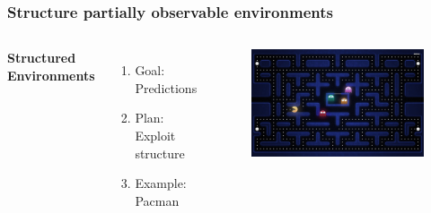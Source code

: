 \documentclass{beamer}
\begin{document}
\begin{frame}
\frametitle{Structure partially observable environments}
\begin{columns}[c] %

\textbf{Structured Environments}
\begin{enumerate}
\item Goal: Predictions
\item Plan: Exploit structure
\item Example: Pacman

\end{enumerate}

\begin{figure}
\includegraphics[width=1.0\linewidth]{lucasplots/pac-man.jpg}
\end{figure}

\end{columns}
\end{frame}

\end{document}
